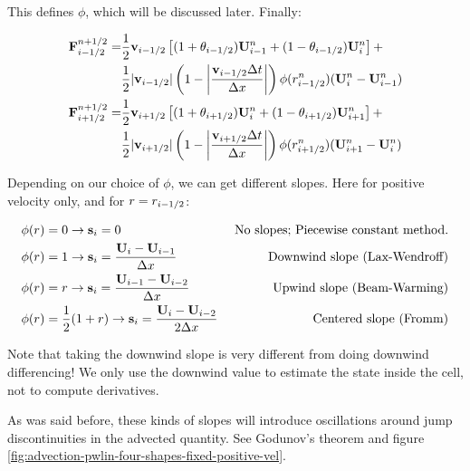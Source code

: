 This defines $\phi$, which will be discussed later. Finally:

\begin{align}
	\mathbf{F}_{i-1/2}^{n+1/2} = 
		&\frac{1}{2} \mathbf{v}_{i-1/2} \left[  (1 + \theta_{i-1/2}) \mathbf{U}_{i-1}^n + (1 - \theta_{i-1/2})  \mathbf{U}_{i}^n \right] +\nonumber\\
		&\frac{1}{2}| \mathbf{v}_{i-1/2} | \left( 1 - \left| \frac{\mathbf{v}_{i-1/2} \Delta t}{\Delta x} \right| \right) \phi(r_{i-1/2}^n) (\mathbf{U}_i^n - \mathbf{U}_{i-1}^n ) \label{eq:advection_phi1}\\
	\mathbf{F}_{i+1/2}^{n+1/2} = 
		&\frac{1}{2} \mathbf{v}_{i+1/2} \left[  (1 + \theta_{i+1/2}) \mathbf{U}_{i}^n + (1 - \theta_{i+1/2})  \mathbf{U}_{i+1}^n \right] +\nonumber\\
		&\frac{1}{2}| \mathbf{v}_{i+1/2} | \left( 1 - \left| \frac{\mathbf{v}_{i+1/2} \Delta t}{\Delta x} \right| \right) \phi(r_{i+1/2}^n) (\mathbf{U}_{i+1}^n - \mathbf{U}_{i}^n ) \label{eq:advection_phi2}
\end{align}







Depending on our choice of $\phi$, we can get different slopes. Here for positive velocity only, and for $r = r_{i-1/2}$:

\begin{align*}
	\phi(r) & = 0 \rightarrow \mathbf{s}_i = 0 
		&\text{ No slopes; Piecewise constant method.}\\
	\phi(r) & = 1 \rightarrow \mathbf{s}_i = \frac{\mathbf{U}_{i} - \mathbf{U}_{i-1}}{\Delta x} 
		&\text{ Downwind slope (Lax-Wendroff)} \\
	\phi(r) & = r \rightarrow \mathbf{s}_i = \frac{\mathbf{U}_{i-1} - \mathbf{U}_{i-2}}{\Delta x} 
		&\text{Upwind slope (Beam-Warming)} \\
	\phi(r) & = \frac{1}{2} (1 + r) \rightarrow \mathbf{s}_i = \frac{\mathbf{U}_{i} - \mathbf{U}_{i-2}}{2 \Delta x} 
		&\text{ Centered slope (Fromm)} \\
\end{align*}



Note that taking the downwind slope is very different from doing downwind differencing!
We only use the downwind value to estimate the state inside the cell, not to compute derivatives.



As was said before, these kinds of slopes will introduce oscillations around jump discontinuities in the advected quantity.
See Godunov's theorem and figure \ref{fig:advection-pwlin-four-shapes-fixed-positive-vel}.



